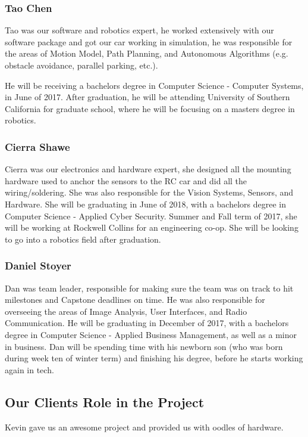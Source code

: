 \documentclass[compsoc,draftclsnofoot,onecolumn,10pt]{IEEEtran}
\begin{document}
\subsubsection*{Tao Chen}
Tao was our software and robotics expert, he worked extensively with our software package and got our car working in simulation, he was responsible for the areas of Motion Model, Path Planning, and Autonomous Algorithms (e.g. obstacle avoidance, parallel parking, etc.).\par
He will be receiving a bachelors degree in Computer Science - Computer Systems, in June of 2017. After graduation, he will be attending University of Southern California for graduate school, where he will be focusing on a masters degree in robotics. 

\subsubsection*{Cierra Shawe}
Cierra was our electronics and hardware expert, she designed all the mounting hardware used to anchor the sensors to the RC car and did all the wiring/soldering. She was also responsible for the Vision Systems, Sensors, and Hardware. She will be graduating in June of 2018, with a bachelors degree in Computer Science - Applied Cyber Security. Summer and Fall term of 2017, she will be working at Rockwell Collins for an engineering co-op. She will be looking to go into a robotics field after graduation. 

\subsubsection*{Daniel Stoyer}
Dan was team leader, responsible for making sure the team was on track to hit milestones and Capstone deadlines on time. He was also responsible for overseeing the areas of Image Analysis, User Interfaces, and Radio Communication. He will be graduating in December of 2017, with a bachelors degree in Computer Science - Applied Business Management, as well as a minor in business. Dan will be spending time with his newborn son (who was born during week ten of winter term) and finishing his degree, before he starts working again in tech. 

\subsection{Our Clients Role in the Project}
Kevin gave us an awesome project and provided us with oodles of hardware.
\end{document}
